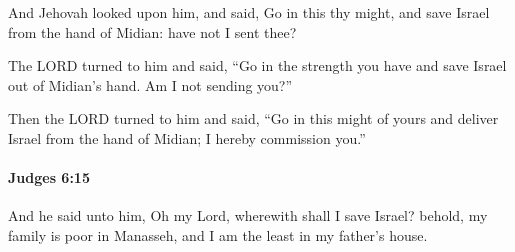 			\begin{versebox}
					\item[BHS] 
					\item[ASV] And Jehovah looked upon him, and said, Go in this thy might, and save Israel from the hand of Midian: have not I sent thee?
					\item[NIV] The LORD turned to him and said, “Go in the strength you have and save Israel out of Midian’s hand. Am I not sending you?”
					\item[NRSV] Then the LORD turned to him and said, “Go in this might of yours and deliver Israel from the hand of Midian; I hereby commission you.”
			\end{versebox}

		\paragraph{Judges 6:15} %
			\label{JUDGES-6-15}

			And he said unto him, Oh my Lord, wherewith shall I save Israel? behold, my family is poor in Manasseh, and I am the least in my father’s house.

